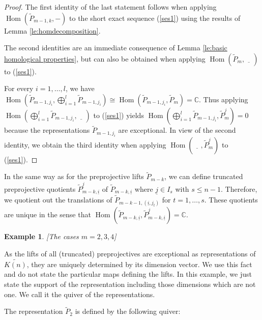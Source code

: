 \documentclass{amsart}
\newtheorem{example}[theorem]{Example}
\newcommand{\ui}{\underline i}
\newcommand{\uj}{\underline j}
\newcommand{\CC}{\mathbb{C}}
\newcommand{\kk}{\Bbbk}
\newcommand{\Ext}{\operatorname{Ext}}
\newcommand{\Hom}{\operatorname{Hom}}
\begin{document}
\begin{proof}
  The first identity of the last statement follows when applying $\Hom(\tilde P_{m-1,k},-)$ to the short exact sequence (\ref{ses1}) using the results of Lemma \ref{le:homdecomposition}.

  The second identities are an immediate consequence of Lemma \ref{le:basic homological properties}, but can also be obtained when applying $\Hom(\tilde P_{m},\underline{\quad})$ to (\ref{ses1}).

  For every $i=1,\ldots,l$, we have $\Hom(\tilde P_{m-1,j_i},\bigoplus_{i=1}^l \tilde P_{m-1,j_i})\cong\Hom(\tilde P_{m-1,j_i},\tilde P_m)=\CC$. Thus applying $\Hom(\bigoplus_{i=1}^l \tilde P_{m-1,j_i},\underline{\quad})$ to (\ref{ses1}) yields $\Hom(\bigoplus_{i=1}^l \tilde P_{m-1,j_i},\tilde P^{\uj}_{m})=0$ because the representations $\tilde P_{m-1,j_i}$ are exceptional. In view of the second identity, we obtain the third identity when applying $\Hom(\underline{\quad},\tilde P^{\uj}_{m})$ to (\ref{ses1}).
\end{proof} 

In the same way as for the preprojective lifts $\tilde P_{m-k}$, we can define truncated preprojective quotients $\tilde P_{m-k,\ui}^{\uj}$ of $\tilde P_{m-k,\ui}$ where $\uj\in I_s$ with $s\leq n-1$. Therefore, we quotient out the translations of $\tilde P_{m-k-1,(\ui,j_t)}$ for $t=1,\ldots,s$. These quotients are unique in the sense that $\Hom(\tilde P_{m-k,\ui},\tilde P_{m-k,\ui}^{\uj})=\CC$.


\begin{example}\label{smallm}[The cases $m=2,3,4$]
\end{example}


As the lifts of all (truncated) preprojectives are exceptional as representations of $\widetilde{K(n)}$, they are uniquely determined by its dimension vector. We use this fact and do not state the particular maps defining the lifts. In this example, we just state the support of the representation including those dimensions which are not one. We call it the quiver of the representations.

The representation $\tilde P_2$ is defined by the following quiver:
\end{document}
